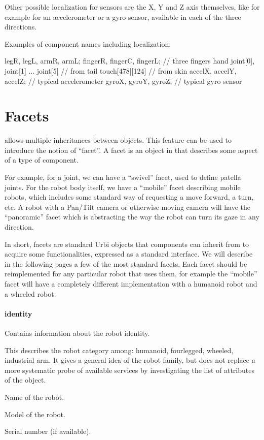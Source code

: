 Other possible localization for sensors are the X, Y and Z axis
themselves, like for example for an accelerometer or a gyro sensor,
available in each of the three directions.


Examples of component names including localization:

\begin{urbifixme}
legR, legL, armR, armL;
fingerR, fingerC, fingerL;      // three fingers hand
joint[0], joint[1] ... joint[5] // from tail
touch[478][124]                 // from skin
accelX, accelY, accelZ;         // typical accelerometer
gyroX, gyroY, gyroZ;            // typical gyro sensor
\end{urbifixme}

\section{Facets}

\urbi allows multiple inheritances between objects. This feature can be
used to introduce the notion of “facet”. A facet is an object in \urbi
that describes some aspect of a type of component.


For example, for a joint, we can have a “swivel” facet, used to define
patella joints. For the robot body itself, we have a “mobile” facet
describing mobile robots, which includes some standard way of
requesting a move forward, a turn, etc. A robot with a Pan/Tilt camera
or otherwise moving camera will have the “panoramic” facet which is
abstracting the way the robot can turn its gaze in any direction.


In short, facets are standard Urbi objects that components can inherit
from to acquire some functionalities, expressed as a standard
interface. We will describe in the following pages a few of the most
standard facets. Each facet should be reimplemented for any particular
robot that uses them, for example the “mobile” facet will have a
completely different implementation with a humanoid robot and a wheeled
robot.

\paragraph{identity}

Contains information about the robot identity.

\begin{slots}
  {
    This describes the robot category among: humanoid, fourlegged,
    wheeled, industrial arm. It gives a general idea of the robot
    family, but does not replace a more systematic probe of available
    services by investigating the list of attributes of the object.
  }

  {%
    Name of the robot.%
  }

  {%
    Model of the robot.%
  }

  {%
    Serial number (if available).%
  }

\end{slots}


